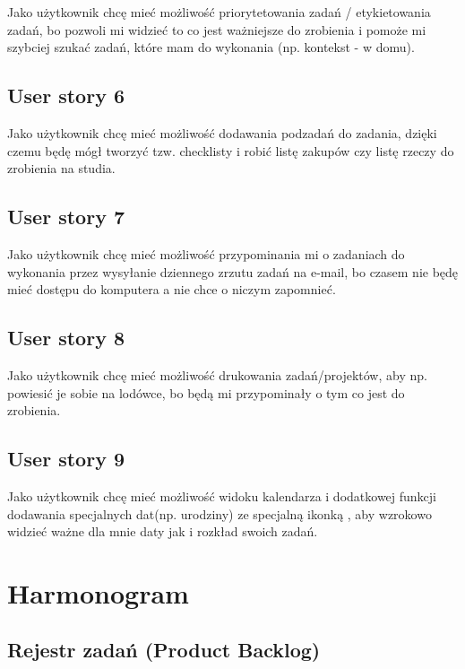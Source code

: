 ﻿\documentclass[a4paper]{article}
\begin{document}
Jako użytkownik chcę mieć możliwość priorytetowania zadań / etykietowania zadań, bo pozwoli mi widzieć to co jest ważniejsze do zrobienia i pomoże mi szybciej szukać zadań, które mam do wykonania (np. kontekst - w domu).

\subsection{User story 6}
\label{subsec:UserStory6}

Jako użytkownik chcę mieć możliwość dodawania podzadań do zadania, dzięki czemu będę mógł tworzyć tzw. checklisty i robić listę zakupów czy listę rzeczy do zrobienia na studia.

\subsection{User story 7}
\label{subsec:UserStory7}

Jako użytkownik chcę mieć możliwość przypominania mi o zadaniach do wykonania  przez wysyłanie dziennego zrzutu zadań na e-mail, bo czasem nie będę mieć dostępu do komputera a nie chce o niczym zapomnieć.

\subsection{User story 8}
\label{subsec:UserStory8}

Jako użytkownik chcę mieć możliwość drukowania zadań/projektów, aby np. powiesić je sobie na lodówce, bo będą mi przypominały o tym co jest do zrobienia.

\subsection{User story 9}
\label{subsec:UserStory9}

Jako użytkownik chcę mieć możliwość widoku kalendarza i dodatkowej funkcji dodawania specjalnych dat(np. urodziny) ze specjalną ikonką , aby wzrokowo widzieć ważne dla mnie daty jak i rozkład swoich zadań.


\newpage
\section{Harmonogram}
\label{sec:Harmonogram}

\subsection{Rejestr zadań (Product Backlog)}
\label{subsec:RejestrZadan}
\end{document}
